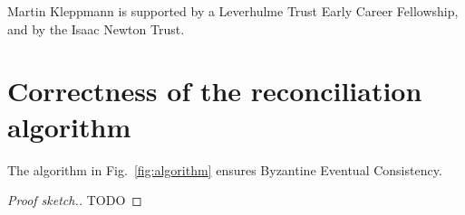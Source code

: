 \documentclass[manuscript,anonymous]{acmart}
\begin{document}








\begin{acks}
Martin Kleppmann is supported by a Leverhulme Trust Early Career Fellowship, and by the Isaac Newton Trust.
\end{acks}




\appendix
\section{Correctness of the reconciliation algorithm}
\begin{theorem}
The algorithm in Fig.~\ref{fig:algorithm} ensures Byzantine Eventual Consistency.
\end{theorem}
\begin{proof}[Proof sketch.]
TODO


\end{proof}
\end{document}
